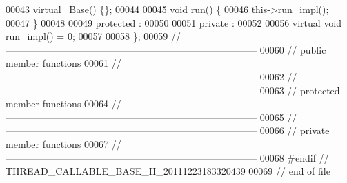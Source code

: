 \begin{DoxyCode}
\hypertarget{thread__callable__base_8h_source_l00043}{}\hyperlink{classhryky_1_1thread_1_1callable_1_1_base_aa35fa37ef7032fb5843cd834f3c323fd}{00043}     \textcolor{keyword}{virtual} \hyperlink{classhryky_1_1thread_1_1callable_1_1_base_aa35fa37ef7032fb5843cd834f3c323fd}{~Base}() \{\};
00044 
00045     \textcolor{keywordtype}{void} run() \{
00046         this->run\_impl();
00047     \}
00048 
00049 \textcolor{keyword}{protected} :
00050 
00051 \textcolor{keyword}{private} :
00052 
00056     \textcolor{keyword}{virtual} \textcolor{keywordtype}{void} run\_impl() = 0;
00057 
00058 \};
00059 \textcolor{comment}{//
      ------------------------------------------------------------------------------}
00060 \textcolor{comment}{// public member functions}
00061 \textcolor{comment}{//
      ------------------------------------------------------------------------------}
00062 \textcolor{comment}{//
      ------------------------------------------------------------------------------}
00063 \textcolor{comment}{// protected member functions}
00064 \textcolor{comment}{//
      ------------------------------------------------------------------------------}
00065 \textcolor{comment}{//
      ------------------------------------------------------------------------------}
00066 \textcolor{comment}{// private member functions}
00067 \textcolor{comment}{//
      ------------------------------------------------------------------------------}
00068 \textcolor{preprocessor}{#endif // THREAD\_CALLABLE\_BASE\_H\_20111223183320439}
00069 \textcolor{preprocessor}{}\textcolor{comment}{// end of file}
\end{DoxyCode}
